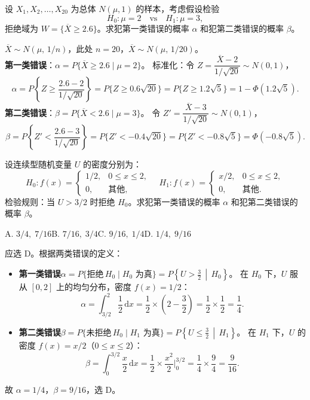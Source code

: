 \documentclass[lang=cn,11pt]{elegantbook}
\begin{document}
\begin{exercise}[正态总体两类错误的计算] \label{ex:error_normal}
设 \(X_1,X_2,\dots,X_{20}\) 为总体 \(N(\mu,1)\) 的样本，考虑假设检验
\[
H_0\colon\mu=2\quad\text{vs}\quad H_1\colon\mu=3,
\]
拒绝域为 \(W=\{\overline{X}\geq 2.6\}\)。求犯第一类错误的概率 \(\alpha\) 和犯第二类错误的概率 \(\beta\)。
\end{exercise}
\begin{solution}
\(\overline{X}\sim N(\mu,\,1/n)\)，此处 \(n=20\)，\(\overline{X}\sim N(\mu,\,1/20)\)。\\
\textbf{第一类错误}：\(\alpha=P\{\overline{X}\geq2.6\mid\mu=2\}\)。
标准化：令 \(Z=\dfrac{\overline{X}-2}{1/\sqrt{20}}\sim N(0,1)\)，
\[
\alpha=P\!\left\{Z\geq\frac{2.6-2}{1/\sqrt{20}}\right\}=P\{Z\geq 0.6\sqrt{20}\}=P\{Z\geq 1.2\sqrt{5}\}=1-\Phi(1.2\sqrt{5}).
\]
\textbf{第二类错误}：\(\beta=P\{\overline{X}<2.6\mid\mu=3\}\)。
令 \(Z'=\dfrac{\overline{X}-3}{1/\sqrt{20}}\sim N(0,1)\)，
\[
\beta=P\!\left\{Z'<\frac{2.6-3}{1/\sqrt{20}}\right\}=P\{Z'<-0.4\sqrt{20}\}=P\{Z'<-0.8\sqrt{5}\}=\Phi(-0.8\sqrt{5}).
\]
\end{solution}


\begin{exercise}\label{exer:9-error-calc}
设连续型随机变量 \(U\) 的密度分别为：
\[
H_0\colon f(x)=\begin{cases}1/2, & 0\leq x\leq2,\\0, & \text{其他},\end{cases}
\quad
H_1\colon f(x)=\begin{cases}x/2, & 0\leq x\leq2,\\0, & \text{其他}.\end{cases}
\]
检验规则：当 \(U>3/2\) 时拒绝 \(H_0\)。求犯第一类错误的概率 \(\alpha\) 和犯第二类错误的概率 \(\beta\)。\par
A. \(3/4,\;7/16\)\qquad B. \(7/16,\;3/4\)\qquad C. \(9/16,\;1/4\)\qquad D. \(1/4,\;9/16\)
\end{exercise}
\begin{solution}
应选 D。根据两类错误的定义：
\begin{itemize}
    \item \textbf{第一类错误}\(\alpha = P\{\text{拒绝}\,H_0 \mid H_0\text{ 为真}\} = P\!\left\{U>\tfrac{3}{2}\,\middle|\,H_0\right\}\)。
    在 \(H_0\) 下，\(U\) 服从 \([0,2]\) 上的均匀分布，密度 \(f(x)=1/2\)：
    \[
    \alpha = \int_{3/2}^{2}\frac{1}{2}\,\mathrm{d}x = \frac{1}{2}\times\left(2-\frac{3}{2}\right) = \frac{1}{2}\times\frac{1}{2} = \frac{1}{4}.
    \]
    \item \textbf{第二类错误}\(\beta = P\{\text{未拒绝}\,H_0 \mid H_1\text{ 为真}\} = P\!\left\{U\leq\tfrac{3}{2}\,\middle|\,H_1\right\}\)。
    在 \(H_1\) 下，\(U\) 的密度 \(f(x)=x/2\)（\(0\leq x\leq2\)）：
    \[
    \beta = \int_0^{3/2}\frac{x}{2}\,\mathrm{d}x = \frac{1}{2}\times\frac{x^2}{2}\Bigg|_0^{3/2} = \frac{1}{4}\times\frac{9}{4} = \frac{9}{16}.
    \]
\end{itemize}
故 \(\alpha=1/4\)，\(\beta=9/16\)，选 D。
\end{solution}
\end{document}
